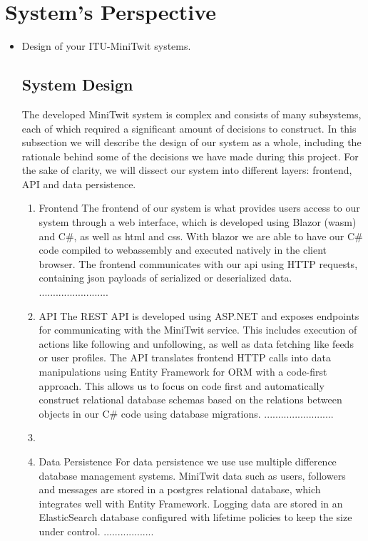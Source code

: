 \section{System's Perspective}

\begin{itemize}
  \item Design of your ITU-MiniTwit systems.
  \subsection{System Design}
  The developed MiniTwit system is complex and consists of many subsystems, each of which required a significant amount of decisions to construct.
  In this subsection we will describe the design of our system as a whole, including the rationale behind some of the decisions we have made during this project.
  \newline
  For the sake of clarity, we will dissect our system into different layers: frontend, API and data persistence.
  \begin{enumerate}
    \item Frontend\newline
    The frontend of our system is what provides users access to our system through a web interface, which is developed using Blazor (wasm) and C#, as well as html and css.
    With blazor we are able to have our C# code compiled to webassembly and executed natively in the client browser.
    The frontend communicates with our api using HTTP requests, containing json payloads of serialized or deserialized data.
    .........................

    \item API\newline
    The REST API is developed using ASP.NET and exposes endpoints for communicating with the MiniTwit service. 
    This includes execution of actions like following and unfollowing, as well as data fetching like feeds or user profiles.
    The API translates frontend HTTP calls into data manipulations using Entity Framework for ORM with a code-first approach.
    This allows us to focus on code first and automatically construct relational database schemas based on the relations between objects in our C# code using database migrations.
    .........................

    \item 
    \item Data Persistence\newline
    For data persistence we use use multiple difference database management systems. 
    MiniTwit data such as users, followers and messages are stored in a postgres relational database, which integrates well with Entity Framework.
    Logging data are stored in an ElasticSearch database configured with lifetime policies to keep the size under control.
    ..................


\end{enumerate}
\end{itemize}
